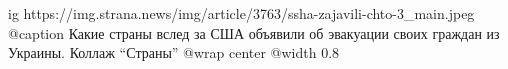  
 
 
 
 

\ifcmt
  ig https://img.strana.news/img/article/3763/ssha-zajavili-chto-3_main.jpeg
  @caption Какие страны вслед за США объявили об эвакуации своих граждан из Украины. Коллаж \enquote{Страны} 
  @wrap center
  @width 0.8
\fi
